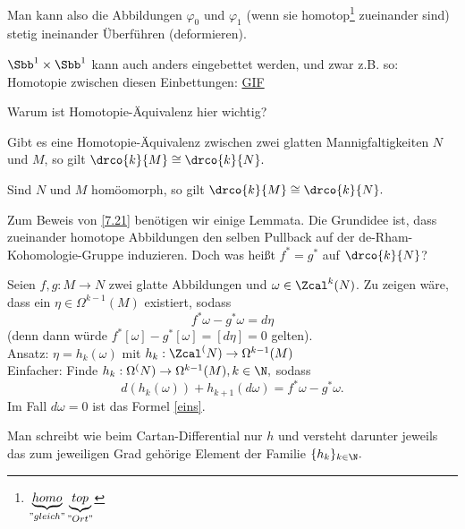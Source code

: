 \begin{rem*}
	Man kann also die Abbildungen \( \varphi_0 \) und \( \varphi_1 \) (wenn sie homotop\footnote{$\underbrace{homo}_{"gleich"}\underbrace{top}_{"Ort"}$} zueinander sind) stetig ineinander Überführen (deformieren).
\end{rem*}

\begin{exmp*}%
	
	\( \Sbb^1 \times \Sbb^1 \) kann auch anders eingebettet werden, und zwar z.B. so:
	Homotopie zwischen diesen Einbettungen:
	\href{https://en.wikipedia.org/wiki/Homotopy#/media/File:Mug_and_Torus_morph.gif}{GIF}
\end{exmp*}

\noindent Warum ist Homotopie-Äquivalenz hier wichtig?

\begin{thm}\label{7.21}
	Gibt es eine Homotopie-Äquivalenz zwischen zwei glatten Mannigfaltigkeiten $N$ und $M$, so gilt \( \drco{k}{M} \cong \drco{k}{N}. \)
\end{thm}

\begin{cor*}
	Sind $N$ und $M$ homöomorph, so gilt \( \drco{k}{M} \cong \drco{k}{N}. \)
\end{cor*}

Zum Beweis von \ref{7.21} benötigen wir einige Lemmata. Die Grundidee ist, dass zueinander homotope Abbildungen den selben Pullback auf der de-Rham-Kohomologie-Gruppe induzieren. Doch was heißt \( f^* = g^* \) auf \( \drco{k}{N} \)?

Seien $f,g: M \to N$ zwei glatte Abbildungen und $\omega \in \Zcal^k(N)$. Zu zeigen wäre, dass ein $\eta \in \Omega^{k-1}(M)$ existiert, sodass
\begin{equation}\label{eins}
	f^*\omega - g^*\omega = d\eta
\end{equation}
(denn dann würde \( f^*[\omega] - g^*[\omega] = [d\eta] = 0 \) gelten).\\
Ansatz: \( \eta = h_k(\omega) \) mit \( h_k: \Zcal^(N) \to \Omega^{k-1}(M) \)\\
Einfacher: Finde \( h_k: \Omega^(N) \to \Omega^{k-1}(M), k \in \N, \) sodass
\begin{equation}\label{zwei}
	d(h_k(\omega)) + h_{k+1}(d\omega) = f^*\omega - g^*\omega.
\end{equation}
Im Fall $d\omega = 0$ ist das Formel \ref{eins}.

\begin{notat*}
	Man schreibt wie beim Cartan-Differential nur $h$ und versteht darunter jeweils das zum jeweiligen Grad gehörige Element der Familie \( \{h_k\}_{k \in \N}. \)
\end{notat*}

